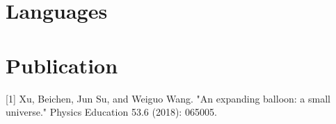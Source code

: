 \documentclass[11pt,a4paper,sans]{moderncv} %
\begin{document}
\section{Languages}



\section{Publication}
[1] Xu, Beichen, Jun Su, and Weiguo Wang. "An expanding balloon: a small universe." Physics Education 53.6 (2018): 065005.
\end{document}
